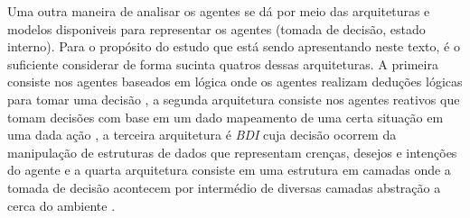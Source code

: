 Uma outra maneira de analisar os agentes se dá por meio das arquiteturas e modelos disponiveis para representar os agentes (tomada de decisão, estado interno). Para o propósito do estudo que está
sendo apresentando neste texto, é o suficiente considerar de forma sucinta quatros dessas arquiteturas. A primeira consiste nos agentes baseados em lógica onde os agentes realizam deduções lógicas
para tomar uma decisão \cite{logicagent}, a segunda arquitetura consiste nos agentes reativos que tomam decisões com base em um dado mapeamento de uma certa situação em uma dada ação \cite{reactiveagent}, 
a terceira arquitetura é \textit{BDI} cuja decisão ocorrem da manipulação de estruturas de dados que representam crenças, desejos e intenções do agente \cite{bdi} e a quarta arquitetura consiste em uma estrutura 
em camadas onde a tomada de decisão acontecem por intermédio de diversas camadas abstração a cerca do ambiente \cite{layeragent} \cite{whatisagent}.  


